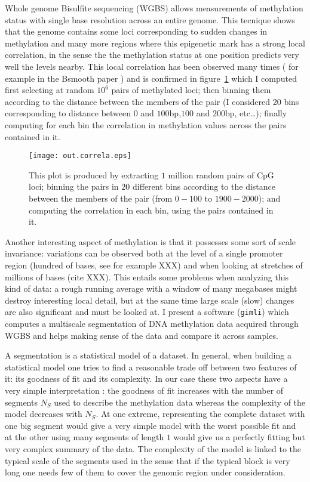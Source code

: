 \documentclass[11pt]{amsart}
\newcommand{\gimli}{\texttt{gimli}}
\begin{document}
Whole genome Bisulfite sequencing (WGBS) allows measurements of methylation 
status with single base resolution across an entire genome. This tecnique shows 
that the genome contains some loci corresponding to sudden changes in methylation 
and many more regions where this epigenetic mark has a strong local
correlation, in the sense the the methylation status at one position predicts 
very well the levels nearby. 
This local correlation has been observed many times ( for example
in the Bsmooth paper \cite{bsmooth}) and is confirmed in 
figure~\ref{corr} which I computed 
first selecting at random $10^6$ pairs of  methylated loci; then binning
them according to the distance between the members of the pair (I considered 20 
bins corresponding to distance between $0$ and $100$bp,$100$ and $200$bp, 
etc\dots);
finally computing for each bin the correlation in methylation values 
across the pairs contained in it.

\begin{center}
\begin{figure}\label{corr}
\texttt{[image: out.correla.eps]}
\caption{This plot is produced by extracting $1$ million random pairs of CpG loci;
binning the pairs in $20$ different bins  according to the distance between the members
of the pair (from $0-100$ to $1900-2000$); and computing the correlation in each bin,
using the pairs contained in it.}
\end{figure}
\end{center}

Another interesting aspect of methylation is that it possesses some sort of scale 
invariance: variations can be observed both at the level of a single promoter
region (hundred of bases, see for example XXX) and when looking at stretches
of millions of bases (cite XXX).
This entails some problems when analyzing this kind of data: a rough
running average with a window of many megabases might destroy interesting
local detail, but at the same time large scale (slow) changes are also
significant and must be looked at.
I present  a software (\gimli) which computes a multiscale segmentation 
of DNA methylation 
data acquired through WGBS and helps making sense of the data and compare 
it across samples.

A segmentation is a statistical model of a dataset.
In general, when building a statistical model one tries to find a reasonable 
trade off between two 
features of it: its goodness of fit and its complexity.
In our case these two aspects have a very simple interpretation : the goodness 
of fit increases with the number of segments $N_S$ used to describe the 
methylation data whereas the complexity of the model decreases with $N_S$.  
At one extreme, representing the complete dataset with one big segment would 
give a very simple model with the worst possible fit and 
at the other using many segments of length $1$ would give us a perfectly 
fitting but very complex summary of the data.
The complexity of the model is linked to the typical scale of the segments used
in the sense that if the typical block is very long one needs few of them to 
cover the genomic region under consideration.
\end{document}
